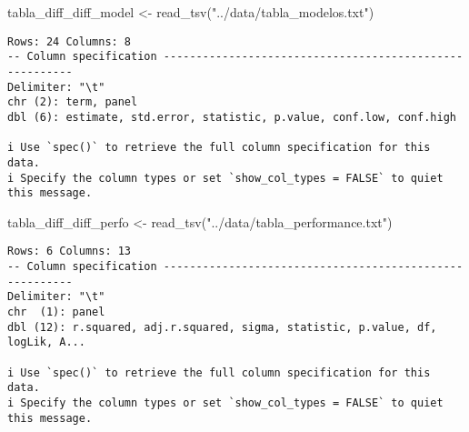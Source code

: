 \documentclass[
  letterpaper,
  DIV=11,
  numbers=noendperiod]{scrartcl}
\newenvironment{Shaded}{\begin{snugshade}}{\end{snugshade}}
\newcommand{\FunctionTok}[1]{\textcolor[rgb]{0.28,0.35,0.67}{#1}}
\newcommand{\NormalTok}[1]{\textcolor[rgb]{0.00,0.23,0.31}{#1}}
\newcommand{\OtherTok}[1]{\textcolor[rgb]{0.00,0.23,0.31}{#1}}
\newcommand{\StringTok}[1]{\textcolor[rgb]{0.13,0.47,0.30}{#1}}
\begin{document}
\begin{Shaded}
\begin{Highlighting}[]
\NormalTok{tabla\_diff\_diff\_model }\OtherTok{\textless{}{-}} \FunctionTok{read\_tsv}\NormalTok{(}\StringTok{"../data/tabla\_modelos.txt"}\NormalTok{)}
\end{Highlighting}
\end{Shaded}

\begin{verbatim}
Rows: 24 Columns: 8
-- Column specification --------------------------------------------------------
Delimiter: "\t"
chr (2): term, panel
dbl (6): estimate, std.error, statistic, p.value, conf.low, conf.high

i Use `spec()` to retrieve the full column specification for this data.
i Specify the column types or set `show_col_types = FALSE` to quiet this message.
\end{verbatim}

\begin{Shaded}
\begin{Highlighting}[]
\NormalTok{tabla\_diff\_diff\_perfo }\OtherTok{\textless{}{-}} \FunctionTok{read\_tsv}\NormalTok{(}\StringTok{"../data/tabla\_performance.txt"}\NormalTok{)}
\end{Highlighting}
\end{Shaded}

\begin{verbatim}
Rows: 6 Columns: 13
-- Column specification --------------------------------------------------------
Delimiter: "\t"
chr  (1): panel
dbl (12): r.squared, adj.r.squared, sigma, statistic, p.value, df, logLik, A...

i Use `spec()` to retrieve the full column specification for this data.
i Specify the column types or set `show_col_types = FALSE` to quiet this message.
\end{verbatim}
\end{document}
